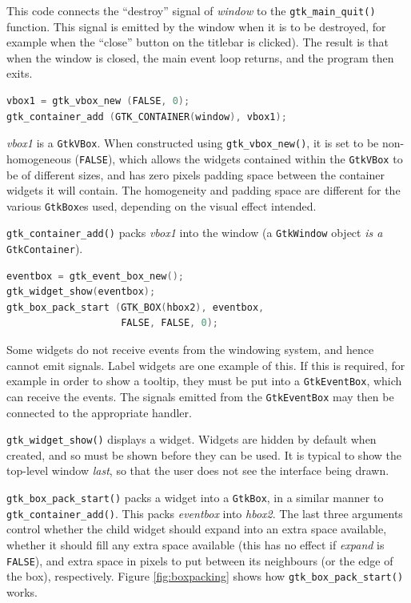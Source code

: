 \documentclass[a4paper,oneside]{article}
\newcommand{\variable}[1]{\textsl{#1}}
\newcommand{\class}[1]{\texttt{#1}}
\newcommand{\function}[1]{\texttt{#1()}}
\newcommand{\code}[1]{\texttt{#1}}
\begin{document}
This code connects the ``destroy'' signal of \variable{window} to the
\function{gtk\_main\_quit} function.  This signal is emitted by the
window when it is to be destroyed, for example when the ``close''
button on the titlebar is clicked).  The result is that when the
window is closed, the main event loop returns, and the program then
exits.

\begin{lstlisting}[numbers=none, language=C]
vbox1 = gtk_vbox_new (FALSE, 0);
gtk_container_add (GTK_CONTAINER(window), vbox1);
\end{lstlisting}

\variable{vbox1} is a \class{GtkVBox}.  When constructed using
\function{gtk\_vbox\_new}, it is set to be non-homogeneous
(\code{FALSE}), which allows the widgets contained within the
\class{GtkVBox} to be of different sizes, and has zero pixels padding
space between the container widgets it will contain.  The homogeneity
and padding space are different for the various \class{GtkBox}es used,
depending on the visual effect intended.

\function{gtk\_container\_add} packs \variable{vbox1} into the window
(a \class{GtkWindow} object \emph{is a} \class{GtkContainer}).

\begin{lstlisting}[numbers=none, language=C]
eventbox = gtk_event_box_new();
gtk_widget_show(eventbox);
gtk_box_pack_start (GTK_BOX(hbox2), eventbox,
                    FALSE, FALSE, 0);
\end{lstlisting}

Some widgets do not receive events from the windowing system, and
hence cannot emit signals.  Label widgets are one example of this.  If
this is required, for example in order to show a tooltip, they must be
put into a \class{GtkEventBox}, which can receive the events.  The
signals emitted from the \class{GtkEventBox} may then be connected to
the appropriate handler.

\function{gtk\_widget\_show} displays a widget.  Widgets are hidden by
default when created, and so must be shown before they can be used.
It is typical to show the top-level window \emph{last}, so that the
user does not see the interface being drawn.

\function{gtk\_box\_pack\_start} packs a widget into a \class{GtkBox},
in a similar manner to \function{gtk\_container\_add}.  This packs
\variable{eventbox} into \variable{hbox2}.  The last three arguments
control whether the child widget should expand into an extra space
available, whether it should fill any extra space available (this has
no effect if \variable{expand} is \code{FALSE}), and extra space in
pixels to put between its neighbours (or the edge of the box),
respectively.  Figure \ref{fig:boxpacking} shows how
\function{gtk\_box\_pack\_start} works.
\end{document}
